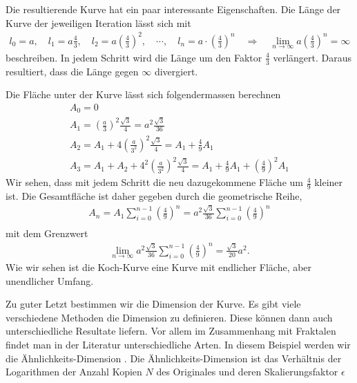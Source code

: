 Die resultierende Kurve hat ein paar interessante Eigenschaften.
Die Länge der Kurve der jeweiligen Iteration lässt sich mit 
\begin{align*}
	l_0 = a ,\quad l_1 = a  \frac{4}{3} ,\quad l_2 = a  \left( \frac{4}{3}\right)^2 , \quad \cdots , \quad
	l_n = a \cdot \left( \frac{4}{3}\right)^n \quad
	\Rightarrow \quad
	\lim_{n\to\infty} a  \left( \frac{4}{3}\right)^n = \infty
\end{align*}
beschreiben.
In jedem Schritt wird die Länge um den Faktor $\frac{4}{3}$ verlängert. Daraus resultiert, dass die Länge gegen $\infty$ divergiert. 


Die Fläche unter der Kurve lässt sich folgendermassen berechnen
\begin{align*}
	A_0 = 0 \\
	A_1 = \left( \frac{a}{3}\right)^2 \frac{\sqrt{3}}{4} = a^2 \frac{\sqrt{3}}{36}\\
	A_2 = A_1 + 4\left( \frac{a}{3^2}\right)^2 \frac{\sqrt{3}}{4} = A_1 + \frac{4}{9} A_1 \\ 
	A_3 = A_1 + A_2 + 4^2 \left( \frac{a}{3^2}\right)^2 \frac{\sqrt{3}}{4} = A_1 + \frac{4}{9} A_1 + \left( \frac{4}{9}\right)^2 A_1	 
\end{align*}
Wir sehen, dass mit jedem Schritt die neu dazugekommene Fläche um $\frac{4}{9}$ kleiner ist.
Die Gesamtfläche ist daher gegeben durch die geometrische Reihe,
\begin{align*}
	A_n = A_1 \sum_{i = 0}^{n-1} \left( \frac{4}{9}\right)^n =  a^2 \frac{\sqrt{3}}{36} \sum_{i = 0}^{n-1} \left( \frac{4}{9}\right)^n \\
\end{align*}
mit dem Grenzwert
\begin{align*}
	\lim_{n\to\infty} a^2 \frac{\sqrt{3}}{36} \sum_{i = 0}^{n-1} \left( \frac{4}{9}\right)^n = \frac{\sqrt{3}}{20} a^2. 
\end{align*}
Wie wir sehen ist die Koch-Kurve eine Kurve mit endlicher Fläche, aber unendlicher Umfang.


Zu guter Letzt bestimmen wir die Dimension der Kurve. 
Es gibt viele verschiedene Methoden die Dimension zu definieren. Diese können dann auch unterschiedliche Resultate liefern.
Vor allem im Zusammenhang mit Fraktalen findet man in der Literatur unterschiedliche Arten.
In diesem Beispiel werden wir die Ähnlichkeits-Dimension \cite{ifs:fractal-geometry}.
Die Ähnlichkeits-Dimension ist das Verhältnis der Logarithmen der Anzahl Kopien $N$ des Originales und deren Skalierungsfaktor $\epsilon$
  
